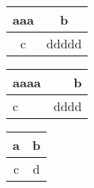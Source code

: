 \documentclass{article}
\begin{document}
	\begin{tabular}{|c|c|}
		aaa & b \\\hline
		c & ddddd
	\end{tabular}
	
	\begin{tabular}{|l|r|}
		\hline
		aaaa & b\\	
		\hline
		c & dddd	\\
		\hline
	\end{tabular}
	
	\begin{center}
		\begin{tabular}{|c|c|}
		a & b \\ \hline
		c & d \\ \hline
		\end{tabular}
	\end{center}
\end{document}
